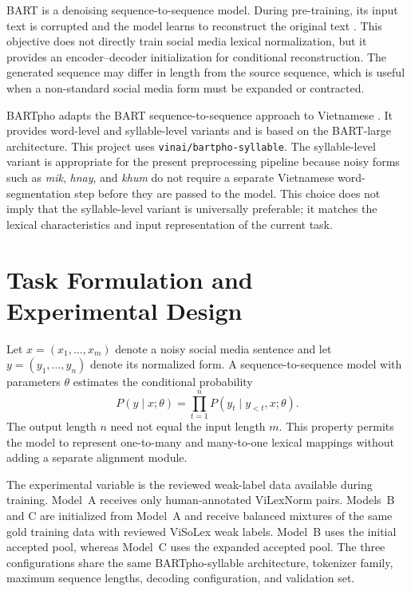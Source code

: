 \documentclass[11pt]{article}
\begin{document}
BART is a denoising sequence-to-sequence model. During pre-training, its input text is corrupted and the model learns to reconstruct the original text \citep{lewis2020bart}. This objective does not directly train social media lexical normalization, but it provides an encoder--decoder initialization for conditional reconstruction. The generated sequence may differ in length from the source sequence, which is useful when a non-standard social media form must be expanded or contracted.

BARTpho adapts the BART sequence-to-sequence approach to Vietnamese \citep{tran2022bartpho}. It provides word-level and syllable-level variants and is based on the BART-large architecture. This project uses \texttt{vinai/bartpho-syllable}. The syllable-level variant is appropriate for the present preprocessing pipeline because noisy forms such as \textit{mik}, \textit{hnay}, and \textit{khum} do not require a separate Vietnamese word-segmentation step before they are passed to the model. This choice does not imply that the syllable-level variant is universally preferable; it matches the lexical characteristics and input representation of the current task.

\section{Task Formulation and Experimental Design}

Let $x=(x_1,\ldots,x_m)$ denote a noisy social media sentence and let $y=(y_1,\ldots,y_n)$ denote its normalized form. A sequence-to-sequence model with parameters $\theta$ estimates the conditional probability
\begin{equation}
P(y\mid x;\theta)=\prod_{t=1}^{n}P(y_t\mid y_{<t},x;\theta).
\end{equation}
The output length $n$ need not equal the input length $m$. This property permits the model to represent one-to-many and many-to-one lexical mappings without adding a separate alignment module.

The experimental variable is the reviewed weak-label data available during training. Model~A receives only human-annotated ViLexNorm pairs. Models~B and C are initialized from Model~A and receive balanced mixtures of the same gold training data with reviewed ViSoLex weak labels. Model~B uses the initial accepted pool, whereas Model~C uses the expanded accepted pool. The three configurations share the same BARTpho-syllable architecture, tokenizer family, maximum sequence lengths, decoding configuration, and validation set.
\end{document}
